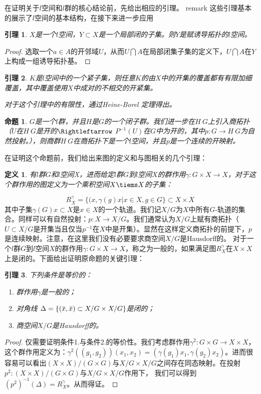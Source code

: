\documentclass{article}
\newtheorem{definition}{定义}
\newtheorem{lemma}{引理}
\newtheorem{proposition}{命题}
\newtheorem{proof}{证明}
\begin{document}
在证明关于$l$空间和$l$群的核心结论前，先给出相应的引理。
remark
这些引理基本的展示了$l$空间的基本结构，在接下来进一步应用
\begin{lemma}
$X$是一个$l$空间，$Y\subset X$是一个局部闭的子集。则$Y$是赋诱导拓扑的$l$空间。
\end{lemma}
\begin{proof}
选取一个$a\in A$的开邻域$U$，从而$U\bigcap A$在局部闭集子集的定义下，$U\bigcap A$在$Y$上构成一组诱导拓扑基。
\end{proof}
\begin{lemma}
$K$是$l$空间中的一个紧子集，则任意$K$的由$X$中的开集的覆盖都有有限加细覆盖，其中覆盖使用$X$中成对的不相交的开紧集。

对于这个引理中的有限性，通过Heine-Borel 定理得出。
\end{lemma}
\begin{proposition}
    $G$是一个$l$群，并且$H$是$G$的一个闭子群。我们进一步在$H\ G$上引入商拓扑（$U$在$H\ G$是开的$\Rightleftarrow$ $P^{-1}(U)$在$G$中为开的，其中$p:G\rightarrow H\ G$为自然投射。），则商群$H\ G$在商拓扑下是一个$l$空间，并且$p$是一个连续的开映射。
\end{proposition}
在证明这个命题前，我们给出来图的定义和与图相关的几个引理：
\begin{definition}
有$l$群$G$和$l$空间X，进而给定$l$群$G$到$l$空间$X$的群作用$\gamma:G\times X\rightarrow X$，对于这个群作用的图定义为一个乘积空间$X\tiems
 X$的子集：
\end{definition}
 $$R^{\gamma}_{X}=\{(x,\gamma(g)x|x\in X, g\in G\}\subset X\times X$$
 其中子集$\gamma(G)x\subset X$是$x\in X$的一个轨道。我们记$X/ G$为$X$中所有$G$-轨道的集合。同样可以有自然投射：$p:X\rightarrow X/G$。我们通常认为$X/G$上赋有商拓扑（$U\subset X/G$是开集当且仅当$p^{-1}$在$X$中是开集）。显然在这样定义商拓扑的前提下，$p$是连续映射。注意，在这里我们没有必要要求商空间$X/G$是Hausdorff的。
 对于一个$l$群$G$到$l$空间$X$的群作用$\gamma:G\times X\rightarrow X$，称之为一般的，如果满足图$R^{\gamma}_{X}$在$X\times X$上是闭的。下面给出证明原命题的关键引理：
 \begin{lemma}
 下列条件是等价的：
 \begin{enumerate}
     \item 群作用$\gamma$是一般的；
     \item 对角线 $\Delta=\{(\Bar{x},\Bar{x})\subset X/G\times X/G\}$是闭的；
     \item 商空间$X/G$是Hausdorff的。
 \end{enumerate}
 \end{lemma}
 \begin{proof}
 仅需要证明条件1.与条件2.的等价性。我们考虑群作用$\gamma^{2}:G\times G\rightarrow X\times X$，这个群作用定义为：$\gamma^{2}((g_{1},g_{2}))(x_{1},x_{2})=(\gamma(g_{1})x_{1},\gamma(g_{2})x_{2})$。进而很容易可以看出$(X\times X)/(G\times G)$与$X/G\times X/G$之间存在同态映射。在投射$p^{2}:(X\times X)/(G\times G)$与$X/G\times X/G$作用下， 我们可以得到$(p^{2})^{-1}(\Delta)=R^{\gamma}_{X}$。从而得证。
 \end{proof}
\end{document}
